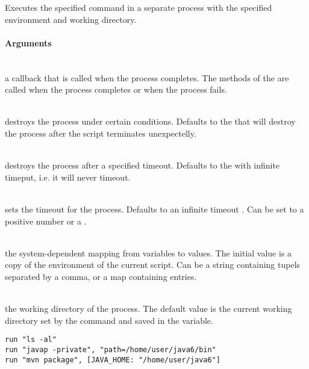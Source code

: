 %


Executes the specified command in a separate process with the
specified environment and working directory.

\paragraph{Arguments}

\begin{asparaitem}
%
\item[\code{handler: ExecuteResultHandler}] \hfill \\
a callback that is called when the process completes. 
The methods of the \cite{executeresulthandler13} 
are called when the process completes or when the process fails.
%
\item[\code{destroyer: ProcessDestroyer}] \hfill \\
\cite{processdestroyer13}  destroys the process under certain conditions.
Defaults to the \cite{shutdownhookprocessdestroyer13}
that will destroy the process after the script terminates unexpectelly.
%
\item[\code{watchdog}] \hfill \\
destroys the process after a specified timeout. Defaults to 
the \cite{executewatchdog13} with infinite timeput, i.e.
it will never timeout.
%
\item[\code{timeout: (+)number|duration}] \hfill \\
sets the timeout for the process. Defaults to an infinite 
timeout  . Can be set to a positive
number or a \cite{duration13}.
%
\item[\code{env}] \hfill \\
the system-dependent mapping from variables
to values. The initial value is a copy of the environment of the current
script. Can be a string containing  tupels
separated by a comma, or a map containing  entries.
%
\item[\code{dir}] \hfill \\
the working directory of the process. The default value
is the current working directory set by the  command
and saved in the  variable.
%
\end{asparaitem}

\begin{lstlisting}[style=Groovybash, label={lst:example_run}]
run "ls -al"
run "javap -private", "path=/home/user/java6/bin"
run "mvn package", [JAVA_HOME: "/home/user/java6"]
\end{lstlisting}

